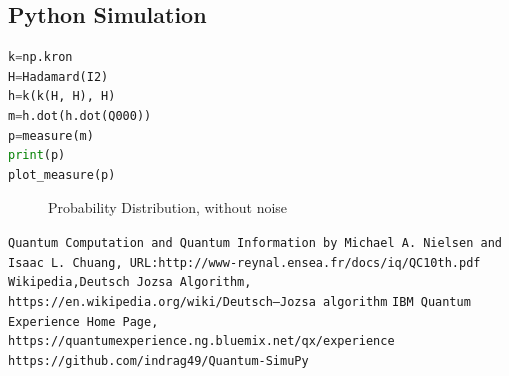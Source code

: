 \documentclass{article}
\begin{document}
\subsection{Python Simulation}
\begin{lstlisting}[language=Python, frame=single]
k=np.kron
H=Hadamard(I2)
h=k(k(H, H), H)
m=h.dot(h.dot(Q000))
p=measure(m)
print(p)
plot_measure(p)
\end{lstlisting}
\begin{figure}[H]
\centering 
\noindent{}%
\caption{Probability Distribution, without noise}
\end{figure}
\begin{thebibliography}{9}
\texttt{Quantum Computation and Quantum Information by Michael A. Nielsen and Isaac L. Chuang, URL:http://www-reynal.ensea.fr/docs/iq/QC10th.pdf}
\texttt{Wikipedia,Deutsch Jozsa Algorithm, https://en.wikipedia.org/wiki/Deutsch–Jozsa algorithm}
\texttt{IBM Quantum Experience Home Page, https://quantumexperience.ng.bluemix.net/qx/experience}
\texttt{https://github.com/indrag49/Quantum-SimuPy}
\end{thebibliography}
\end{document}
